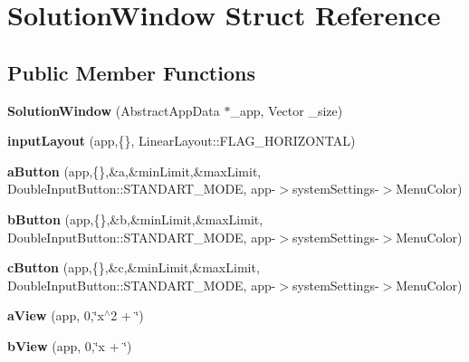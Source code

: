 \hypertarget{struct_solution_window}{
\section{SolutionWindow Struct Reference}
\label{struct_solution_window}
}
\subsection*{Public Member Functions}
\begin{DoxyCompactItemize}
\item 
\hypertarget{struct_solution_window_a2547013608af5cba7d78d21b6b6d7c48}{
{\bfseries SolutionWindow} (AbstractAppData $\ast$\_\-app, Vector \_\-size)}
\label{struct_solution_window_a2547013608af5cba7d78d21b6b6d7c48}

\item 
\hypertarget{struct_solution_window_a305d44e316a355b7d8c69546da58f824}{
{\bfseries inputLayout} (app,\{\}, LinearLayout::FLAG\_\-HORIZONTAL)}
\label{struct_solution_window_a305d44e316a355b7d8c69546da58f824}

\item 
\hypertarget{struct_solution_window_a175022b70954fae40ba27f4ea68125d9}{
{\bfseries aButton} (app,\{\},\&a,\&minLimit,\&maxLimit, DoubleInputButton::STANDART\_\-MODE, app-\/$>$systemSettings-\/$>$MenuColor)}
\label{struct_solution_window_a175022b70954fae40ba27f4ea68125d9}

\item 
\hypertarget{struct_solution_window_a6a087dee81c3c01d925d7527710709f5}{
{\bfseries bButton} (app,\{\},\&b,\&minLimit,\&maxLimit, DoubleInputButton::STANDART\_\-MODE, app-\/$>$systemSettings-\/$>$MenuColor)}
\label{struct_solution_window_a6a087dee81c3c01d925d7527710709f5}

\item 
\hypertarget{struct_solution_window_a76137e29f12768665f0beb001cab8539}{
{\bfseries cButton} (app,\{\},\&c,\&minLimit,\&maxLimit, DoubleInputButton::STANDART\_\-MODE, app-\/$>$systemSettings-\/$>$MenuColor)}
\label{struct_solution_window_a76137e29f12768665f0beb001cab8539}

\item 
\hypertarget{struct_solution_window_a18cf698a1c7e4078cb84e77e9a678313}{
{\bfseries aView} (app, 0,\char`\"{}x$^\wedge$2 + \char`\"{})}
\label{struct_solution_window_a18cf698a1c7e4078cb84e77e9a678313}

\item 
\hypertarget{struct_solution_window_a9d36a6bd6ba4a8407c91e31a662f25d4}{
{\bfseries bView} (app, 0,\char`\"{}x + \char`\"{})}
\label{struct_solution_window_a9d36a6bd6ba4a8407c91e31a662f25d4}


\end{DoxyCompactItemize}
